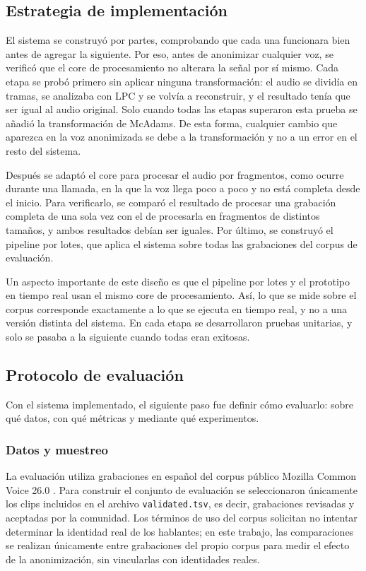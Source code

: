 \documentclass[10pt,twocolumn]{article}
\newcommand{\parencite}[1]{\citep{#1}}
\begin{document}
\subsection{Estrategia de implementación}\label{sec:3.5}

El sistema se construyó por partes, comprobando que cada una funcionara bien antes de agregar la siguiente. Por eso, antes de anonimizar cualquier voz, se verificó que el core de procesamiento no alterara la señal por sí mismo. Cada etapa se probó primero sin aplicar ninguna transformación: el audio se dividía en tramas, se analizaba con LPC y se volvía a reconstruir, y el resultado tenía que ser igual al audio original. Solo cuando todas las etapas superaron esta prueba se añadió la transformación de McAdams. De esta forma, cualquier cambio que aparezca en la voz anonimizada se debe a la transformación y no a un error en el resto del sistema.

Después se adaptó el core para procesar el audio por fragmentos, como ocurre durante una llamada, en la que la voz llega poco a poco y no está completa desde el inicio. Para verificarlo, se comparó el resultado de procesar una grabación completa de una sola vez con el de procesarla en fragmentos de distintos tamaños, y ambos resultados debían ser iguales. Por último, se construyó el pipeline por lotes, que aplica el sistema sobre todas las grabaciones del corpus de evaluación.

Un aspecto importante de este diseño es que el pipeline por lotes y el prototipo en tiempo real usan el mismo core de procesamiento. Así, lo que se mide sobre el corpus corresponde exactamente a lo que se ejecuta en tiempo real, y no a una versión distinta del sistema. En cada etapa se desarrollaron pruebas unitarias, y solo se pasaba a la siguiente cuando todas eran exitosas.

\subsection{Protocolo de evaluación}\label{sec:3.6}

Con el sistema implementado, el siguiente paso fue definir cómo evaluarlo: sobre qué datos, con qué métricas y mediante qué experimentos.

\subsubsection{Datos y muestreo}\label{sec:3.6.1}

La evaluación utiliza grabaciones en español del corpus público Mozilla Common Voice 26.0 \parencite{ardila2020}. Para construir el conjunto de evaluación se seleccionaron únicamente los clips incluidos en el archivo \texttt{validated.tsv}, es decir, grabaciones revisadas y aceptadas por la comunidad. Los términos de uso del corpus solicitan no intentar determinar la identidad real de los hablantes; en este trabajo, las comparaciones se realizan únicamente entre grabaciones del propio corpus para medir el efecto de la anonimización, sin vincularlas con identidades reales.
\end{document}

